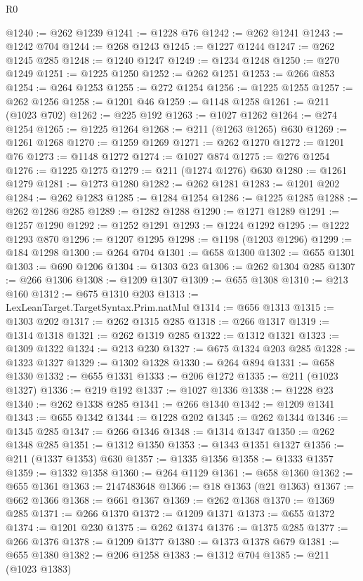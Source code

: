 \begin{lexlean}{R0}
\begin{coremodule}
@1240 := @262 @1239
@1241 := @1228 @76
@1242 := @262 @1241
@1243 := @1242 @704
@1244 := @268 @1243
@1245 := @1227 @1244
@1247 := @262 @1245 @285
@1248 := @1240 @1247
@1249 := @1234 @1248
@1250 := @270 @1249
@1251 := @1225 @1250
@1252 := @262 @1251
@1253 := @266 @853
@1254 := @264 @1253
@1255 := @272 @1254
@1256 := @1225 @1255
@1257 := @262 @1256
@1258 := @1201 @46
@1259 := @1148 @1258
@1261 := @211 (@1023 @702)
@1262 := @225 @192
@1263 := @1027 @1262
@1264 := @274 @1254
@1265 := @1225 @1264
@1268 := @211 (@1263 @1265) @630
@1269 := @1261 @1268
@1270 := @1259 @1269
@1271 := @262 @1270
@1272 := @1201 @76
@1273 := @1148 @1272
@1274 := @1027 @874
@1275 := @276 @1254
@1276 := @1225 @1275
@1279 := @211 (@1274 @1276) @630
@1280 := @1261 @1279
@1281 := @1273 @1280
@1282 := @262 @1281
@1283 := @1201 @202
@1284 := @262 @1283
@1285 := @1284 @1254
@1286 := @1225 @1285
@1288 := @262 @1286 @285
@1289 := @1282 @1288
@1290 := @1271 @1289
@1291 := @1257 @1290
@1292 := @1252 @1291
@1293 := @1224 @1292
@1295 := @1222 @1293 @870
@1296 := @1207 @1295
@1298 := @1198 (@1203 @1296)
@1299 := @184 @1298
@1300 := @264 @704
@1301 := @658 @1300
@1302 := @655 @1301
@1303 := @690 @1206
@1304 := @1303 @23
@1306 := @262 @1304 @285
@1307 := @266 @1306
@1308 := @1209 @1307
@1309 := @655 @1308
@1310 := @213 @160
@1312 := @675 @1310 @203
@1313 := LexLeanTarget.TargetSyntax.Prim.natMul
@1314 := @656 @1313
@1315 := @1303 @202
@1317 := @262 @1315 @285
@1318 := @266 @1317
@1319 := @1314 @1318
@1321 := @262 @1319 @285
@1322 := @1312 @1321
@1323 := @1309 @1322
@1324 := @213 @230
@1327 := @675 @1324 @203 @285
@1328 := @1323 @1327
@1329 := @1302 @1328
@1330 := @264 @894
@1331 := @658 @1330
@1332 := @655 @1331
@1333 := @206 @1272
@1335 := @211 (@1023 @1327)
@1336 := @219 @192
@1337 := @1027 @1336
@1338 := @1228 @23
@1340 := @262 @1338 @285
@1341 := @266 @1340
@1342 := @1209 @1341
@1343 := @655 @1342
@1344 := @1228 @202
@1345 := @262 @1344
@1346 := @1345 @285
@1347 := @266 @1346
@1348 := @1314 @1347
@1350 := @262 @1348 @285
@1351 := @1312 @1350
@1353 := @1343 @1351 @1327
@1356 := @211 (@1337 @1353) @630
@1357 := @1335 @1356
@1358 := @1333 @1357
@1359 := @1332 @1358
@1360 := @264 @1129
@1361 := @658 @1360
@1362 := @655 @1361
@1363 := 2147483648
@1366 := @18 @1363 (@21 @1363)
@1367 := @662 @1366
@1368 := @661 @1367
@1369 := @262 @1368
@1370 := @1369 @285
@1371 := @266 @1370
@1372 := @1209 @1371
@1373 := @655 @1372
@1374 := @1201 @230
@1375 := @262 @1374
@1376 := @1375 @285
@1377 := @266 @1376
@1378 := @1209 @1377
@1380 := @1373 @1378 @679
@1381 := @655 @1380
@1382 := @206 @1258
@1383 := @1312 @704
@1385 := @211 (@1023 @1383)

\end{coremodule}
\end{lexlean}
